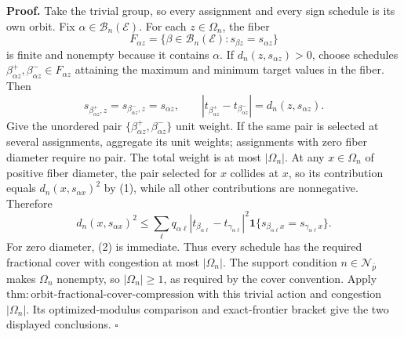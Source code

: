 \textbf{Proof.}
Take the trivial group, so every assignment and every sign schedule is its own orbit.  Fix \(\alpha\in\mathcal B_n(\mathcal E)\).  For each \(z\in\Omega_n\), the fiber
\[
 F_{\alpha z}
 =\{\beta\in\mathcal B_n(\mathcal E):s_{\beta z}=s_{\alpha z}\}
\]
is finite and nonempty because it contains \(\alpha\).  If \(d_n(z,s_{\alpha z})>0\), choose schedules \(\beta^+_{\alpha z},\beta^-_{\alpha z}\in F_{\alpha z}\) attaining the maximum and minimum target values in the fiber.  Then
\[
 s_{\beta^+_{\alpha z},z}=s_{\beta^-_{\alpha z},z}=s_{\alpha z},
 \qquad
 |t_{\beta^+_{\alpha z}}-t_{\beta^-_{\alpha z}}|
 =d_n(z,s_{\alpha z}). \tag{1}
\]
Give the unordered pair \(\{\beta^+_{\alpha z},\beta^-_{\alpha z}\}\) unit weight.  If the same pair is selected at several assignments, aggregate its unit weights; assignments with zero fiber diameter require no pair.  The total weight is at most \(|\Omega_n|\).  At any \(x\in\Omega_n\) of positive fiber diameter, the pair selected for \(x\) collides at \(x\), so its contribution equals \(d_n(x,s_{\alpha x})^2\) by (1), while all other contributions are nonnegative.  Therefore
\[
 d_n(x,s_{\alpha x})^2
 \le
 \sum_\ell q_{\alpha\ell}
 |t_{\beta_{\alpha\ell}}-t_{\gamma_{\alpha\ell}}|^2
 \mathbf 1\{s_{\beta_{\alpha\ell}x}=s_{\gamma_{\alpha\ell}x}\}. \tag{2}
\]
For zero diameter, (2) is immediate.  Thus every schedule has the required fractional cover with congestion at most \(|\Omega_n|\).  The support condition \(n\in\mathcal N_{\bar p}\) makes \(\Omega_n\) nonempty, so \(|\Omega_n|\ge1\), as required by the cover convention.  Apply \(\mathrm{thm{:}orbit\text{-}fractional\text{-}cover\text{-}compression}\) with this trivial action and congestion \(|\Omega_n|\).  Its optimized-modulus comparison and exact-frontier bracket give the two displayed conclusions. \(\square\)